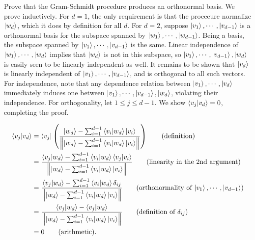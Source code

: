  Prove that the Gram-Schmidt procedure produces an orthonormal basis.
\Soln
We prove inductively.  For $d = 1$, the only requirement is that the procecure normalize $\ket{w_d}$, which it does by definition for all $d$.   For $d = 2$, suppose $\ket{v_1}, \cdots,\ket{v_{d-1}}$ is a orthonormal basis for the subspace spanned by  $\ket{w_1},\cdots,\ket{w_{d-1}}$.  Being a basis, the subspace spanned by $\ket{v_1},\cdots,\ket{v_{d-1}}$ is the same.  Linear independence of $\ket{w_1},\cdots,\ket{w_d}$ implies that $\ket{w_d}$ is not in this subspace, so $\ket{v_1},\cdots,\ket{v_{d-1}},\ket{w_d}$ is easily seen to be linearly independent as well.  It remains to be shown that $\ket{v_d}$ is linearly independent of $\ket{v_1},\cdots,\ket{v_{d-1}}$, and is orthogonal to all such vectors.  For independence, note that any dependence relation between $\ket{v_1},\cdots,\ket{v_d}$ immediately induces one between $\ket{v_1},\cdots,\ket{v_{d-1}},\ket{w_d}$, violating their independence.  For orthogonality, let $1\leq j\leq d-1$.  We show $\braket{v_j|v_d} = 0$, completing the proof.

\begin{comment}
\begin{align*}
	\ket{v_2} &= \frac{\ket{w_2} - \braket{v_1 | w_2}\ket{v_1}}{\norm{\ket{w_2} - \braket{v_1 | w_2}\ket{v_1}}}\\
	\braket{v_1 | v_2} &= \bra{v_1} \left(\frac{\ket{w_2} - \braket{v_1 | w_2}\ket{v_1}}{\norm{\ket{w_2} - \braket{v_1 | w_2}\ket{v_1}}}\right)\\
		&= \frac{\braket{v_1 | w_2} - \braket{v_1 | w_2}\braket{v_1 | v_1}}{\norm{\ket{w_2} - \braket{v_1 | w_2}\ket{v_1}}}\\
		&= 0.
\end{align*}
\end{comment}


\begin{align*}
	\braket{v_j | v_d} &= \bra{v_j} \left(\frac{\ket{w_d} - \sum_{i=1}^{d-1}\braket{v_i | w_d}\ket{v_i}}{\norm{\ket{w_d} - \sum_{i=1}^{d-1}\braket{v_i | w_d}\ket{v_i}}}\right) \tag{definition}\\
	&= \frac{\braket{v_j | w_d} - \sum_{i=1}^{d-1}\braket{v_i | w_d}\braket{v_j | v_i}}{\norm{\ket{w_d} - \sum_{i=1}^{d-1}\braket{v_i | w_d}\ket{v_i}}} \tag{linearity in the 2nd argument}\\
	&= \frac{\braket{v_j | w_d} - \sum_{i=1}^{d-1}\braket{v_i | w_d}\delta_{ij}}{\norm{\ket{w_d} - \sum_{i=1}^{d-1}\braket{v_i | w_d}\ket{v_i}}} \tag{orthonormality of $\ket{v_1},\cdots,\ket{v_{d-1}}$}\\
	&= \frac{\braket{v_j | w_d} - \braket{v_j | w_d}}{\norm{\ket{w_d} - \sum_{i=1}^{d-1}\braket{v_i | w_d}\ket{v_i}}} \tag{definition of $\delta_{ij}$}\\
	&= 0 \tag{arithmetic}.
\end{align*}

